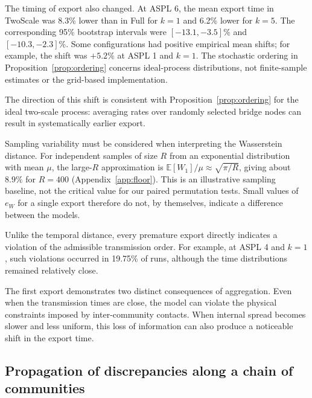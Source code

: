 \documentclass{ieeeaccess}
\newcommand{\michael}[2]{{\color{RoyalBlue}#1}}
\newcommand{\Full}{\textup{Full}}
\newcommand{\TS}{\textup{TwoScale}}
\newcommand{\eW}{e_{W}}
\begin{document}
The timing of export also changed. At ASPL 6, the mean export time in \TS{} was 8.3\% lower than in \Full{} for $k=1$ and 6.2\% lower for $k=5$. The corresponding 95\% bootstrap intervals were $[-13.1,-3.5]\%$ and $[-10.3,-2.3]\%$. \michael{Some configurations had positive empirical mean shifts; for example, the shift was $+5.2\%$ at ASPL 1 and $k=1$. The stochastic ordering in Proposition~\ref{prop:ordering} concerns ideal-process distributions, not finite-sample estimates or the grid-based implementation.}{A positive shift in the mean export time was not observed in any configuration in this series.}

The direction of this shift is consistent with Proposition~\ref{prop:ordering} for the ideal two-scale process: averaging rates over randomly selected bridge nodes can result in systematically earlier export.

Sampling variability must be considered when interpreting the Wasserstein distance. \michael{For independent samples of size $R$ from an exponential distribution with mean $\mu$, the large-$R$ approximation is $\mathbb{E}[W_1]/\mu\approx\sqrt{\pi/R}$, giving about $8.9\%$ for $R=400$ (Appendix~\ref*{app:floor}). This is an illustrative sampling baseline, not the critical value for our paired permutation tests.}{For nearly exponential export times with $R=400$, the expected normalised distance between two independent samples from the same distribution is approximately $\sqrt{\pi/R}\approx9\%$ (Appendix~\ref*{app:floor}).} Small values of $\eW$ for a single export therefore do not, by themselves, indicate a difference between the models.

Unlike the temporal distance, every premature export directly indicates a violation of the admissible transmission order. For example, at ASPL 4 and $k=1$, such violations occurred in 19.75\% of runs, although the time distributions remained relatively close.

The first export demonstrates two distinct consequences of aggregation. Even when the transmission times are close, the model can violate the physical constraints imposed by inter-community contacts. When internal spread becomes slower and less uniform, this loss of information can also produce a noticeable shift in the export time.

\subsection{Propagation of discrepancies along a chain of communities}
\label{sec:res_chain_random}
\end{document}
